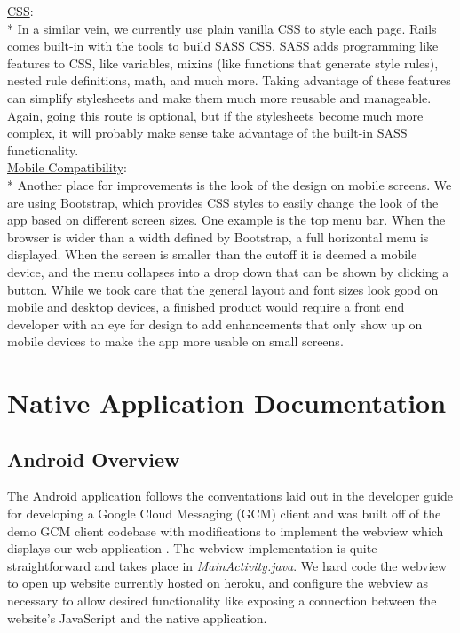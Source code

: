 \documentclass[12pt,letterpaper,titlepage]{article}
\begin{document}
\noindent\underline{CSS}:\\*
In a similar vein, we currently use plain vanilla CSS to style each page. Rails comes built-in with the tools to build SASS CSS. SASS adds programming like features to CSS, like variables, mixins (like functions that generate style rules), nested rule definitions, math, and much more. Taking advantage of these features can simplify stylesheets and make them much more reusable and manageable. Again, going this route is optional, but if the stylesheets become much more complex, it will probably make sense take advantage of the built-in SASS functionality.\\

\noindent\underline{Mobile Compatibility}:\\*
Another place for improvements is the look of the design on mobile screens. We are using Bootstrap, which provides CSS styles to easily change the look of the app based on different screen sizes. One example is the top menu bar. When the browser is wider than a width defined by Bootstrap, a full horizontal menu is displayed. When the screen is smaller than the cutoff it is deemed a mobile device, and the menu collapses into a drop down that can be shown by clicking a button. While we took care that the general layout and font sizes look good on mobile and desktop devices, a finished product would require a front end developer with an eye for design to add enhancements that only show up on mobile devices to make the app more usable on small screens.

\section{Native Application Documentation} \label{doc:NativeApplicationDocumentation}

\subsection{Android Overview} \label{doc:AndroidOverview}

The Android application follows the conventations laid out in the developer guide for developing a Google Cloud Messaging (GCM) client \cite{gcm} and was built off of the demo GCM client codebase \cite{gcm source code} with modifications to implement the webview which displays our web application \cite{android webview}. The webview implementation is quite straightforward and takes place in \textit{MainActivity.java}. We hard code the webview to open up website currently hosted on heroku, and configure the webview as necessary to allow desired functionality like exposing a connection between the website's JavaScript and the native application.\\
\end{document}
